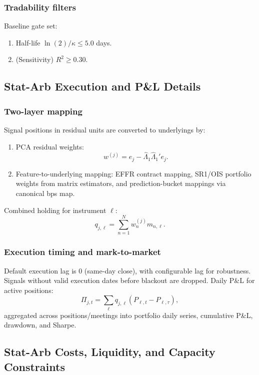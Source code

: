 \subsubsection*{Tradability filters}
Baseline gate set:
\begin{enumerate}
    \item Half-life $\ln(2)/\kappa \le 5.0$ days.
    \item (Sensitivity) $R^2 \ge 0.30$.
\end{enumerate}

\subsection{Stat-Arb Execution and P\&L Details}
\label{app:statarb_execution_pnl}

\subsubsection*{Two-layer mapping}
Signal positions in residual units are converted to underlyings by:
\begin{enumerate}
    \item PCA residual weights:
    \[
    w^{(j)} = e_j - \hat{\Lambda}_{1}\hat{\Lambda}_{1}'e_j.
    \]
    \item Feature-to-underlying mapping:
    EFFR contract mapping, SR1/OIS portfolio weights from matrix estimators,
    and prediction-bucket mappings via canonical bps map.
\end{enumerate}
Combined holding for instrument $\ell$:
\[
q_{j,\ell}=\sum_{n=1}^{N} w_n^{(j)} m_{n,\ell}.
\]

\subsubsection*{Execution timing and mark-to-market}
Default execution lag is 0 (same-day close), with configurable lag for
robustness. Signals without valid execution dates before blackout are dropped.
Daily P\&L for active positions:
\[
\Pi_{j,t}=\sum_{\ell} q_{j,\ell}(P_{\ell,t}-P_{\ell,\tau}),
\]
aggregated across positions/meetings into portfolio daily series, cumulative
P\&L, drawdown, and Sharpe.

\subsection{Stat-Arb Costs, Liquidity, and Capacity Constraints}
\label{app:statarb_costs_liquidity}


